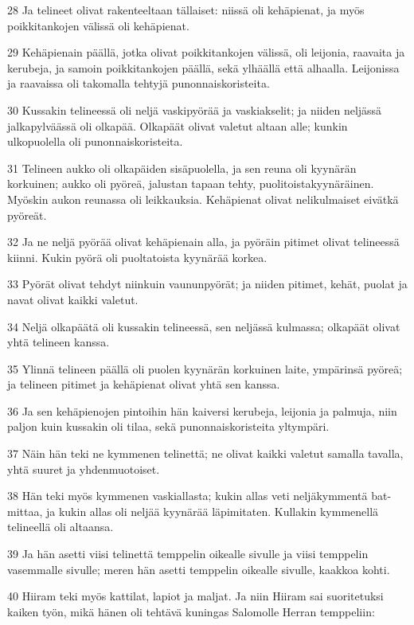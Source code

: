 \par 28 Ja telineet olivat rakenteeltaan tällaiset: niissä oli kehäpienat, ja myös poikkitankojen välissä oli kehäpienat.
\par 29 Kehäpienain päällä, jotka olivat poikkitankojen välissä, oli leijonia, raavaita ja kerubeja, ja samoin poikkitankojen päällä, sekä ylhäällä että alhaalla. Leijonissa ja raavaissa oli takomalla tehtyjä punonnaiskoristeita.
\par 30 Kussakin telineessä oli neljä vaskipyörää ja vaskiakselit; ja niiden neljässä jalkapylväässä oli olkapää. Olkapäät olivat valetut altaan alle; kunkin ulkopuolella oli punonnaiskoristeita.
\par 31 Telineen aukko oli olkapäiden sisäpuolella, ja sen reuna oli kyynärän korkuinen; aukko oli pyöreä, jalustan tapaan tehty, puolitoistakyynäräinen. Myöskin aukon reunassa oli leikkauksia. Kehäpienat olivat nelikulmaiset eivätkä pyöreät.
\par 32 Ja ne neljä pyörää olivat kehäpienain alla, ja pyöräin pitimet olivat telineessä kiinni. Kukin pyörä oli puoltatoista kyynärää korkea.
\par 33 Pyörät olivat tehdyt niinkuin vaununpyörät; ja niiden pitimet, kehät, puolat ja navat olivat kaikki valetut.
\par 34 Neljä olkapäätä oli kussakin telineessä, sen neljässä kulmassa; olkapäät olivat yhtä telineen kanssa.
\par 35 Ylinnä telineen päällä oli puolen kyynärän korkuinen laite, ympärinsä pyöreä; ja telineen pitimet ja kehäpienat olivat yhtä sen kanssa.
\par 36 Ja sen kehäpienojen pintoihin hän kaiversi kerubeja, leijonia ja palmuja, niin paljon kuin kussakin oli tilaa, sekä punonnaiskoristeita yltympäri.
\par 37 Näin hän teki ne kymmenen telinettä; ne olivat kaikki valetut samalla tavalla, yhtä suuret ja yhdenmuotoiset.
\par 38 Hän teki myös kymmenen vaskiallasta; kukin allas veti neljäkymmentä bat-mittaa, ja kukin allas oli neljää kyynärää läpimitaten. Kullakin kymmenellä telineellä oli altaansa.
\par 39 Ja hän asetti viisi telinettä temppelin oikealle sivulle ja viisi temppelin vasemmalle sivulle; meren hän asetti temppelin oikealle sivulle, kaakkoa kohti.
\par 40 Hiiram teki myös kattilat, lapiot ja maljat. Ja niin Hiiram sai suoritetuksi kaiken työn, mikä hänen oli tehtävä kuningas Salomolle Herran temppeliin:
